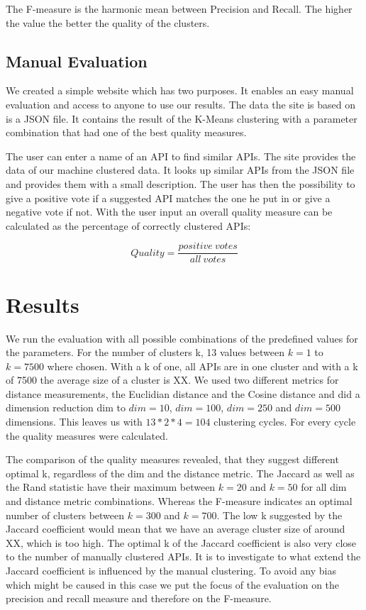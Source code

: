 \documentclass[a4paper]{IEEEtran}
\begin{document}
The F-measure is the harmonic mean between Precision and Recall. The higher the value the better the quality of the clusters.

\subsection{Manual Evaluation}
We created a simple website which has two purposes. It enables an easy manual evaluation and access to anyone to use our results. The data the site is based on is a JSON file. It contains the result of the K-Means clustering with a parameter combination that had one of the best quality measures.

The user can enter a name of an API to find similar APIs. The site provides the data of our machine clustered data. It looks up similar APIs from the JSON file and provides them with a small description. The user has then the possibility to give a positive vote if a suggested API matches the one he put in or give a negative vote if not.
With the user input an overall quality measure can be calculated as the percentage of correctly clustered APIs:

\begin{equation*}
Quality= \frac{positive~votes}{all~votes}
\end{equation*}

\section{Results}
We run the evaluation with all possible combinations of the predefined values for the parameters. For the number of clusters k, 13 values between $k=1$ to $k=7500$ where chosen. With a k of one, all APIs are in one cluster and with a k of 7500 the average size of a cluster is XX. We used two different metrics for distance measurements, the Euclidian distance and the Cosine distance and did a dimension reduction dim to $dim⁡= 10$, $dim⁡= 100$, $dim⁡=  250$ and  $dim⁡= 500$ dimensions. This leaves us with $13*2*4=104$ clustering cycles. For every cycle the quality measures were calculated.

The comparison of the quality measures revealed, that they suggest different optimal k, regardless of the dim and the distance metric. The Jaccard as well as the Rand statistic have their maximum between $k=20$ and $k=50$ for all dim and distance metric combinations. Whereas the F-measure indicates an optimal number of clusters between $k=300$ and $k=700$.
The low k suggested by the Jaccard coefficient would mean that we have an average cluster size of around XX, which is too high. The optimal k of the Jaccard coefficient is also very close to the number of manually clustered APIs. It is to investigate to what extend the Jaccard coefficient is influenced by the manual clustering. To avoid any bias which might be caused in this case we put the focus of the evaluation on the precision and recall measure and therefore on the F-measure.
\end{document}
